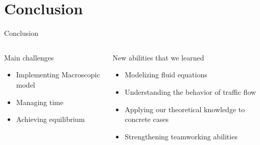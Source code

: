 \documentclass{beamer}
\begin{document}
\section{Conclusion}

\begin{frame}{Conclusion}
	\begin{columns}
		\vspace{-1.4cm}
		\begin{block}{Main challenges}
			\begin{itemize}
				\item Implementing Macroscopic model
				\item Managing time
				\item Achieving equilibrium
			\end{itemize}
		\end{block}
		
		\begin{block}{New abilities that we learned}
			\begin{itemize}
				\item Modelizing fluid equations
				\item Understanding the behavior of traffic flow
				\item Applying our theoretical knowledge to concrete cases
				\item Strengthening teamworking abilities
			\end{itemize}
		\end{block}
	\end{columns}
\end{frame}
\end{document}
